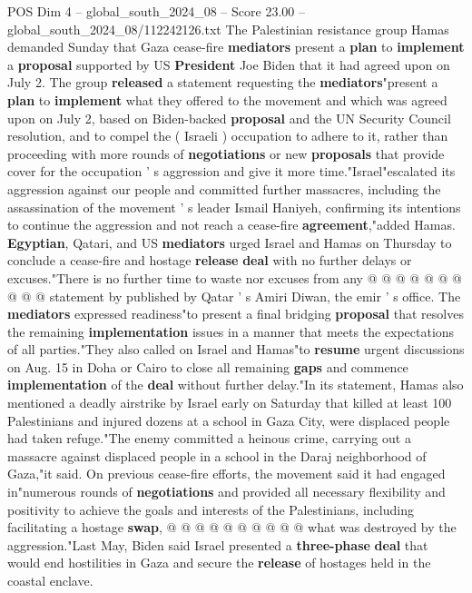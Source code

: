 \begin{textsample}{POS Dim 4 – global\_south\_2024\_08 – Score 23.00 – global\_south\_2024\_08/112242126.txt}  \label{ex:f4_pos_125}
The Palestinian resistance group Hamas demanded Sunday that Gaza cease-fire \textbf{mediators} present a \textbf{plan} to \textbf{implement} a \textbf{proposal} supported by US \textbf{President} Joe Biden that it had agreed upon on July 2.
The group \textbf{released} a statement requesting the \textbf{mediators}"present a \textbf{plan} to \textbf{implement} what they offered to the movement and which was agreed upon on July 2, based on Biden-backed \textbf{proposal} and the UN Security Council resolution, and to compel the ( Israeli ) occupation to adhere to it, rather than proceeding with more rounds of \textbf{negotiations} or new \textbf{proposals} that provide cover for the occupation ' s aggression and give it more time."Israel"escalated its aggression against our people and committed further massacres, including the assassination of the movement ' s leader Ismail Haniyeh, confirming its intentions to continue the aggression and not reach a cease-fire \textbf{agreement},"added Hamas. \textbf{Egyptian}, Qatari, and US \textbf{mediators} urged Israel and Hamas on Thursday to conclude a cease-fire and hostage \textbf{release} \textbf{deal} with no further delays or excuses."There is no further time to waste nor excuses from any @ @ @ @ @ @ @ @ @ @ statement by published by Qatar ' s Amiri Diwan, the emir ' s office.
The \textbf{mediators} expressed readiness"to present a final bridging \textbf{proposal} that resolves the remaining \textbf{implementation} issues in a manner that meets the expectations of all parties."They also called on Israel and Hamas"to \textbf{resume} urgent discussions on Aug. 15 in Doha or Cairo to close all remaining \textbf{gaps} and commence \textbf{implementation} of the \textbf{deal} without further delay."In its statement, Hamas also mentioned a deadly airstrike by Israel early on Saturday that killed at least 100 Palestinians and injured dozens at a school in Gaza City, were displaced people had taken refuge."The enemy committed a heinous crime, carrying out a massacre against displaced people in a school in the Daraj neighborhood of Gaza,"it said.
On previous cease-fire efforts, the movement said it had engaged in"numerous rounds of \textbf{negotiations} and provided all necessary flexibility and positivity to achieve the goals and interests of the Palestinians, including facilitating a hostage \textbf{swap}, @ @ @ @ @ @ @ @ @ @ what was destroyed by the aggression."Last May, Biden said Israel presented a \textbf{three-phase} \textbf{deal} that would end hostilities in Gaza and secure the \textbf{release} of hostages held in the coastal enclave.

\end{textsample}

